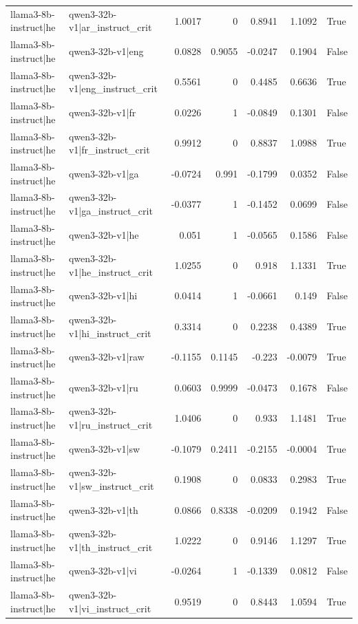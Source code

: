 \begin{table}
\begin{tabular}{l l r r r r l}
llama3-8b-instruct|he & qwen3-32b-v1|ar_instruct_crit & 1.0017 & 0 & 0.8941 & 1.1092 & True \\
llama3-8b-instruct|he & qwen3-32b-v1|eng & 0.0828 & 0.9055 & -0.0247 & 0.1904 & False \\
llama3-8b-instruct|he & qwen3-32b-v1|eng_instruct_crit & 0.5561 & 0 & 0.4485 & 0.6636 & True \\
llama3-8b-instruct|he & qwen3-32b-v1|fr & 0.0226 & 1 & -0.0849 & 0.1301 & False \\
llama3-8b-instruct|he & qwen3-32b-v1|fr_instruct_crit & 0.9912 & 0 & 0.8837 & 1.0988 & True \\
llama3-8b-instruct|he & qwen3-32b-v1|ga & -0.0724 & 0.991 & -0.1799 & 0.0352 & False \\
llama3-8b-instruct|he & qwen3-32b-v1|ga_instruct_crit & -0.0377 & 1 & -0.1452 & 0.0699 & False \\
llama3-8b-instruct|he & qwen3-32b-v1|he & 0.051 & 1 & -0.0565 & 0.1586 & False \\
llama3-8b-instruct|he & qwen3-32b-v1|he_instruct_crit & 1.0255 & 0 & 0.918 & 1.1331 & True \\
llama3-8b-instruct|he & qwen3-32b-v1|hi & 0.0414 & 1 & -0.0661 & 0.149 & False \\
llama3-8b-instruct|he & qwen3-32b-v1|hi_instruct_crit & 0.3314 & 0 & 0.2238 & 0.4389 & True \\
llama3-8b-instruct|he & qwen3-32b-v1|raw & -0.1155 & 0.1145 & -0.223 & -0.0079 & True \\
llama3-8b-instruct|he & qwen3-32b-v1|ru & 0.0603 & 0.9999 & -0.0473 & 0.1678 & False \\
llama3-8b-instruct|he & qwen3-32b-v1|ru_instruct_crit & 1.0406 & 0 & 0.933 & 1.1481 & True \\
llama3-8b-instruct|he & qwen3-32b-v1|sw & -0.1079 & 0.2411 & -0.2155 & -0.0004 & True \\
llama3-8b-instruct|he & qwen3-32b-v1|sw_instruct_crit & 0.1908 & 0 & 0.0833 & 0.2983 & True \\
llama3-8b-instruct|he & qwen3-32b-v1|th & 0.0866 & 0.8338 & -0.0209 & 0.1942 & False \\
llama3-8b-instruct|he & qwen3-32b-v1|th_instruct_crit & 1.0222 & 0 & 0.9146 & 1.1297 & True \\
llama3-8b-instruct|he & qwen3-32b-v1|vi & -0.0264 & 1 & -0.1339 & 0.0812 & False \\
llama3-8b-instruct|he & qwen3-32b-v1|vi_instruct_crit & 0.9519 & 0 & 0.8443 & 1.0594 & True \\

\end{tabular}
\end{table}

